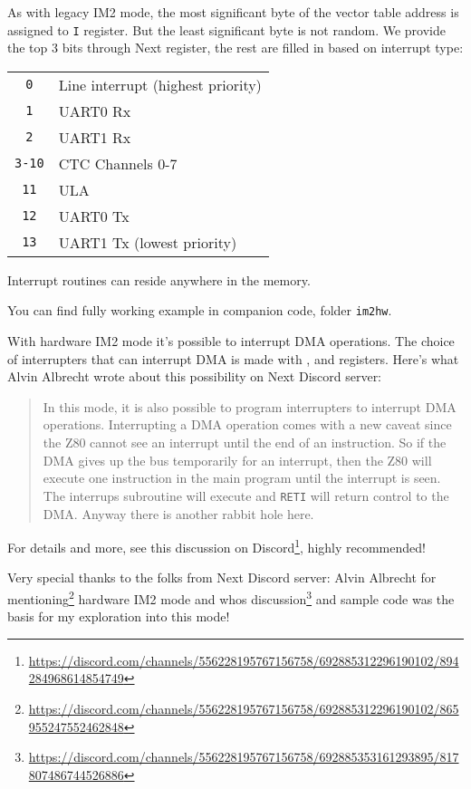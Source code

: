 As with legacy IM2 mode, the most significant byte of the vector table address is assigned to {\tt I} register. But the least significant byte is not random. We provide the top 3 bits through  Next register, the rest are filled in based on interrupt type:

\begin{tabular}{cl}
	{\tt 0} & Line interrupt (highest priority) \\
	{\tt 1} & UART0 Rx \\
	{\tt 2} & UART1 Rx \\
	{\tt 3-10} & CTC Channels 0-7 \\
	{\tt 11} & ULA \\
	{\tt 12} & UART0 Tx \\
	{\tt 13} & UART1 Tx (lowest priority) \\
\end{tabular}

Interrupt routines can reside anywhere in the memory.

You can find fully working example in companion code, folder {\tt im2hw}.

With hardware IM2 mode it's possible to interrupt DMA operations. The choice of interrupters that can interrupt DMA is made with ,  and  registers. Here's what Alvin Albrecht wrote about this possibility on Next Discord server:

\vspace*{-1ex}
\begin{quote}
	In this mode, it is also possible to program interrupters to interrupt DMA operations. Interrupting a DMA operation comes with a new caveat since the Z80 cannot see an interrupt until the end of an instruction. So if the DMA gives up the bus temporarily for an interrupt, then the Z80 will execute one instruction in the main program until the interrupt is seen. The interrups subroutine will execute and {\tt RETI} will return control to the DMA. Anyway there is another rabbit hole here.
\end{quote}

For details and more, see this discussion on Discord\footnote{\url{https://discord.com/channels/556228195767156758/692885312296190102/894284968614854749}}, highly recommended!

Very special thanks to the folks from Next Discord server: Alvin Albrecht for mentioning\footnote{\url{https://discord.com/channels/556228195767156758/692885312296190102/865955247552462848}} hardware IM2 mode and  whos discussion\footnote{\url{https://discord.com/channels/556228195767156758/692885353161293895/817807486744526886}} and sample code was the basis for my exploration into this mode!



